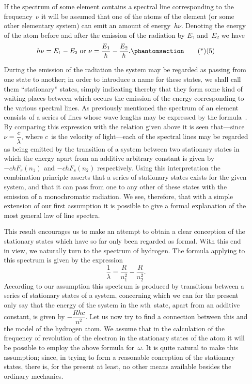 If the spectrum of some element contains a spectral line corresponding
to the frequency~$\nu$ it will be assumed that one of the
atoms of the element (or some other elementary system) can emit
an amount of energy~$h\nu$. Denoting the energy of the atom before
and after the emission of the radiation by $E_{1}$ and~$E_{2}$ we have
\[
h\nu = E_{1} - E_{2} \text{ or }
\nu = \frac{E_{1}}{h} - \frac{E_{2}}{h}.
\Tag{(5)}
\]

During the emission of the radiation the system may be regarded
as passing from one state to another; in order to introduce a name
for these states, we shall call them ``stationary'' states, simply
indicating thereby that they form some kind of waiting places
between which occurs the emission of the energy corresponding to
the various spectral lines. As previously mentioned the spectrum
of an element consists of a series of lines whose wave lengths may
be expressed by the formula~. By comparing this expression
with the relation given above it is seen that---since $\nu = \dfrac{c}{\lambda}$, where $c$~is
the velocity of light---each of the spectral lines may be regarded
as being emitted by the transition of a system between two stationary
states in which the energy apart from an additive arbitrary
constant is given by $-ch F_{r}(n_{1})$ and $-ch F_{s}(n_{2})$ respectively. Using
this interpretation the combination principle asserts that a series
of stationary states exists for the given system, and that it can
pass from one to any other of these states with the emission of
a monochromatic radiation. We see, therefore, that with a simple
extension of our first assumption it is possible to give a formal
explanation of the most general law of line spectra.

 This result encourages us to make an
attempt to obtain a clear conception of the stationary states which
have so far only been regarded as formal. With this end in view,
we naturally turn to the spectrum of hydrogen. The formula
applying to this spectrum is given by the expression
\[
\frac{1}{\lambda} = \frac{R}{n_{1}^{2}} - \frac{R}{n_{2}^{2}}.
\]
According to our assumption this spectrum is produced by transitions
between a series of stationary states of a system, concerning
which we can for the present only say that the energy of the system
in the $n$th~state, apart from an additive constant, is given by
$-\dfrac{Rhc}{n^{2}}$. Let us now try to find a connection between this and the
model of the hydrogen atom. We assume that in the calculation
of the frequency of revolution of the electron in the stationary states
of the atom it will be possible to employ the above formula for~$\omega$.
It is quite natural to make this assumption; since, in trying to
form a reasonable conception of the stationary states, there is, for
the present at least, no other means available besides the ordinary
mechanics.

